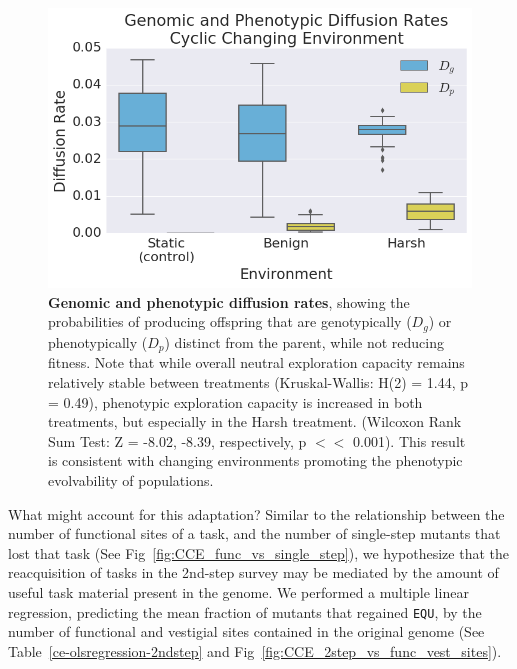 \documentclass[10pt,letterpaper]{article}
\begin{document}
	\begin{figure}[!h] %
	\includegraphics[width=0.75\columnwidth]{figures/CE/CCE_D_g_D_p__box.png}
	\caption{\textbf{Genomic and phenotypic diffusion rates}, showing the probabilities of producing offspring that are genotypically ($D_g$) or phenotypically ($D_p$) distinct from the parent, while not reducing fitness.
	Note that while overall neutral exploration capacity remains relatively stable between treatments (Kruskal-Wallis: H(2) = 1.44, p = 0.49), phenotypic exploration capacity is increased in both treatments, but especially in the Harsh treatment. (Wilcoxon Rank Sum Test: Z = -8.02, -8.39, respectively, p $<<$ 0.001). This result is consistent with changing environments promoting the phenotypic evolvability of populations.
	}\label{fig:CCE_diffusion_rate}
	\end{figure}

What might account for this adaptation? Similar to the relationship between the number of functional sites of a task, and the number of single-step mutants that lost that task (See Fig~\ref{fig:CCE_func_vs_single_step}), we hypothesize that the reacquisition of tasks in the 2nd-step survey may be mediated by the amount of useful task material present in the genome. We performed a multiple linear regression, predicting the mean fraction of mutants that regained \texttt{EQU}, by the number of functional and vestigial sites contained in the original genome (See Table~\ref{ce-olsregression-2ndstep} and Fig~\ref{fig:CCE_2step_vs_func_vest_sites}).
\end{document}
